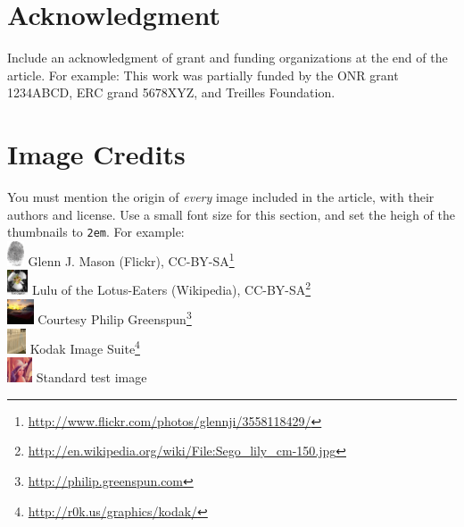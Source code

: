 \documentclass{ipol}
\begin{document}
\section*{Acknowledgment}

Include an acknowledgment of grant and funding organizations at the
end of the article. For example: This work was partially funded by the
ONR grant 1234ABCD, ERC grand 5678XYZ, and Treilles Foundation.

\section*{Image Credits}

You must mention the origin of \emph{every} image included in the article,
with their authors and license. Use a small font size for this
section, and set the heigh of the thumbnails to \verb|2em|. For example:\\
{\small
\includegraphics[height=2em]{images/finger.png}
  Glenn J. Mason (Flickr),
  CC-BY-SA\footnote{\url{http://www.flickr.com/photos/glennji/3558118429/}}\\     
\includegraphics[height=2em]{images/lily.png}
  Lulu of the Lotus-Eaters (Wikipedia),
  CC-BY-SA\footnote{\url{http://en.wikipedia.org/wiki/File:Sego\_lily\_cm-150.jpg}}\\
\includegraphics[height=2em]{images/ferrari.png}
  Courtesy Philip Greenspun\footnote{\url{http://philip.greenspun.com}}\\
\includegraphics[height=2em]{images/k19.png}
  Kodak Image Suite\footnote{\url{http://r0k.us/graphics/kodak/}} \\
\includegraphics[height=2em]{images/lena.png}
  Standard test image
}




\end{document}
